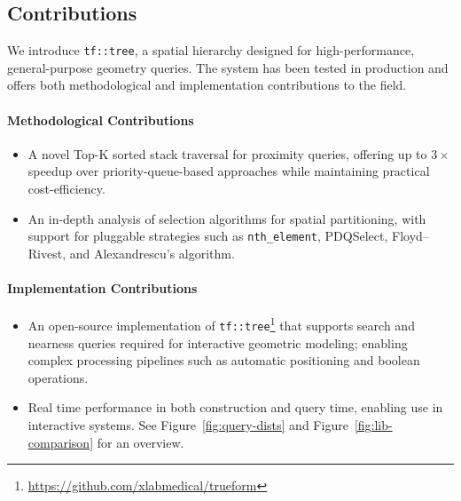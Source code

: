 

\subsection{Contributions}

We introduce \texttt{tf::tree}, a spatial hierarchy designed for high-performance,  
general-purpose geometry queries. The system has been tested in production and  
offers both methodological and implementation contributions to the field.

\paragraph*{Methodological Contributions}
\begin{itemize}
  \item A novel Top-K sorted stack traversal for proximity queries,  
        offering up to $3\times$ speedup over priority-queue-based approaches  
        while maintaining practical cost-efficiency.
  \item An in-depth analysis of selection algorithms for spatial partitioning,  
        with support for pluggable strategies such as \texttt{nth\_element},  
        PDQSelect, Floyd--Rivest, and Alexandrescu's algorithm.
\end{itemize}

\paragraph*{Implementation Contributions}
\begin{itemize}
\item An open-source implementation of
      \texttt{tf::tree}\footnote{\url{https://github.com/xlabmedical/trueform}}  
      that supports search and nearness queries required for interactive geometric  
      modeling; enabling complex processing pipelines such as automatic  
      positioning and boolean operations.
  \item Real time performance in both construction and query time,  
        enabling use in interactive systems. See Figure~\ref{fig:query-dists}
        and Figure~\ref{fig:lib-comparison} for an overview.
\end{itemize}



